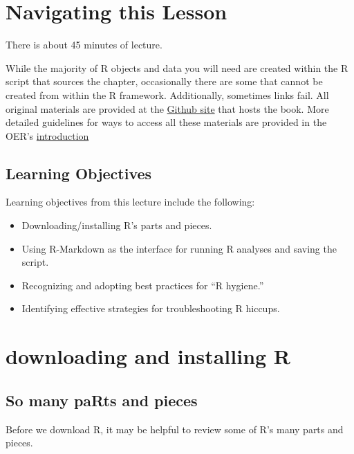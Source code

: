 \documentclass[
  11pt,
]{book}
\providecommand{\tightlist}{%
  \setlength{\itemsep}{0pt}\setlength{\parskip}{0pt}}
\begin{document}
\hypertarget{navigating-this-lesson}{%
\section{Navigating this Lesson}\label{navigating-this-lesson}}

There is about 45 minutes of lecture.

While the majority of R objects and data you will need are created within the R script that sources the chapter, occasionally there are some that cannot be created from within the R framework. Additionally, sometimes links fail. All original materials are provided at the \href{https://github.com/lhbikos/ReCenterPsychStats}{Github site} that hosts the book. More detailed guidelines for ways to access all these materials are provided in the OER's \protect\hyperlink{ReCintro}{introduction}

\hypertarget{learning-objectives}{%
\subsection{Learning Objectives}\label{learning-objectives}}

Learning objectives from this lecture include the following:

\begin{itemize}
\tightlist
\item
  Downloading/installing R's parts and pieces.
\item
  Using R-Markdown as the interface for running R analyses and saving the script.
\item
  Recognizing and adopting best practices for ``R hygiene.''
\item
  Identifying effective strategies for troubleshooting R hiccups.
\end{itemize}

\hypertarget{downloading-and-installing-r}{%
\section{downloading and installing R}\label{downloading-and-installing-r}}

\hypertarget{so-many-parts-and-pieces}{%
\subsection{So many paRts and pieces}\label{so-many-parts-and-pieces}}

Before we download R, it may be helpful to review some of R's many parts and pieces.
\end{document}
